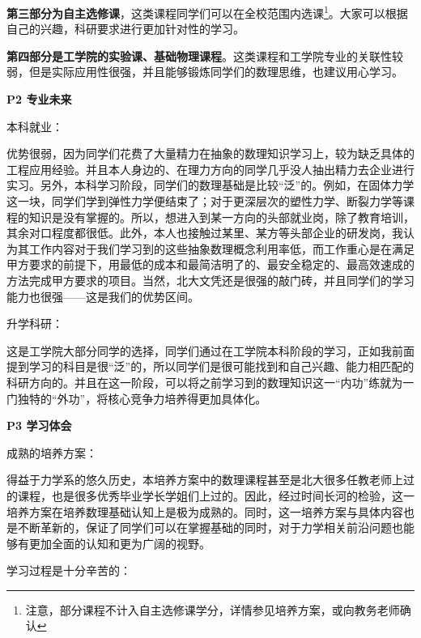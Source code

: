 \documentclass[11pt,oneside]{book}
\begin{document}
\textbf{第三部分为自主选修课}，这类课程同学们可以在全校范围内选课\footnote{注意，部分课程不计入自主选修课学分，详情参见培养方案，或向教务老师确认}。大家可以根据自己的兴趣，科研要求进行更加针对性的学习。

\vspace{10pt}

\textbf{第四部分是工学院的实验课、基础物理课程}。这类课程和工学院专业的关联性较弱，但是实际应用性很强，并且能够锻炼同学们的数理思维，也建议用心学习。

\vspace{10pt}

\textbf{P2 专业未来}

本科就业：

优势很弱，因为同学们花费了大量精力在抽象的数理知识学习上，较为缺乏具体的工程应用经验。并且本人身边的、在理力方向的同学几乎没人抽出精力去企业进行实习。另外，本科学习阶段，同学们的数理基础是比较“泛”的。例如，在固体力学这一块，同学们学到弹性力学便结束了；对于更深层次的塑性力学、断裂力学等课程的知识是没有掌握的。所以，想进入到某一方向的头部就业岗，除了教育培训，其余对口程度都很低。此外，本人也接触过某里、某方等头部企业的研发岗，我认为其工作内容对于我们学习到的这些抽象数理概念利用率低，而工作重心是在满足甲方要求的前提下，用最低的成本和最简洁明了的、最安全稳定的、最高效速成的方法完成甲方要求的项目。当然，北大文凭还是很强的敲门砖，并且同学们的学习能力也很强——这是我们的优势区间。

\vspace{10pt}

升学科研：

这是工学院大部分同学的选择，同学们通过在工学院本科阶段的学习，正如我前面提到学习的科目是很“泛”的，所以同学们是很可能找到和自己兴趣、能力相匹配的科研方向的。并且在这一阶段，可以将之前学习到的数理知识这一“内功”练就为一门独特的“外功”，将核心竞争力培养得更加具体化。

\vspace{10pt}

\textbf{P3 学习体会}

成熟的培养方案：

得益于力学系的悠久历史，本培养方案中的数理课程甚至是北大很多任教老师上过的课程，也是很多优秀毕业学长学姐们上过的。因此，经过时间长河的检验，这一培养方案在培养数理基础认知上是极为成熟的。同时，这一培养方案与具体内容也是不断革新的，保证了同学们可以在掌握基础的同时，对于力学相关前沿问题也能够有更加全面的认知和更为广阔的视野。

\vspace{10pt}

学习过程是十分辛苦的：
\end{document}
